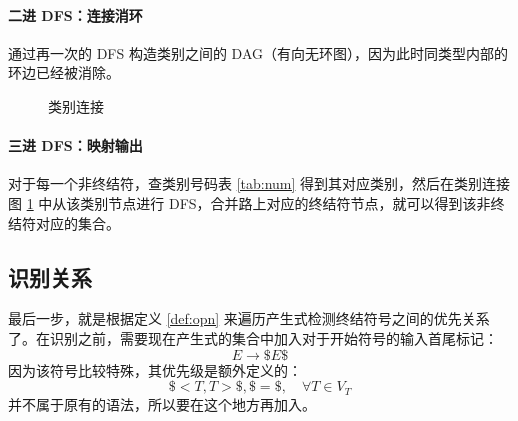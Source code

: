 \documentclass[UTF8]{ctexart}
\begin{document}
\paragraph{二进 DFS：连接消环} 通过再一次的 DFS 构造类别之间的 DAG（有向无环图），因为此时同类型内部的环边已经被消除。

\begin{figure}[H]
    \centering
    \caption{类别连接}\label{fig:conn}
\end{figure}

\paragraph{三进 DFS：映射输出} 对于每一个非终结符，查类别号码表 \ref{tab:num} 得到其对应类别，然后在类别连接图 \ref{fig:conn} 中从该类别节点进行 DFS，合并路上对应的终结符节点，就可以得到该非终结符对应的集合。

\begin{table}[h]
    \centering
    \caption{集合}
\end{table}

\subsection{识别关系}

最后一步，就是根据定义 \ref{def:opn} 来遍历产生式检测终结符号之间的优先关系了。在识别之前，需要现在产生式的集合中加入对于开始符号的输入首尾标记：
\begin{equation*}
    E \rightarrow \$ E \$
\end{equation*}
因为该符号比较特殊，其优先级是额外定义的\cite{opgwiki}：
\begin{equation*}
    \$ < T, T > \$, \$=\$,\quad \forall T\in V_T
\end{equation*}
并不属于原有的语法，所以要在这个地方再加入。
\end{document}
